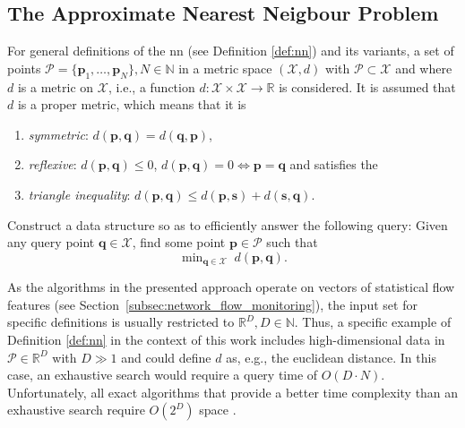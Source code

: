 \documentclass[../../../main.tex]{subfiles}
\begin{document}
\subsection{The Approximate Nearest Neigbour Problem}\label{subsec:approximate_nearest_neighbour_problem}

For general definitions of the \gls{nn} (see Definition \ref{def:nn}) and its variants, a set of points $\mathcal{P} = \{\bm{p}_1, \dots, \bm{p}_N \}, N \in \mathbb{N}$ in a metric space $(\mathcal{X}, d)$ with $\mathcal{P} \subset \mathcal{X}$ and where $d$ is a metric on $\mathcal{X}$, i.e., a function $d: \mathcal{X} \times \mathcal{X} \rightarrow \mathbb{R}$ is considered. It is assumed that $d$ is a proper metric, which means that it is

\begin{enumerate}
    \item \textit{symmetric}: $d(\bm{p},\bm{q})=d(\bm{q},\bm{p})$,
    \item \textit{reflexive}: $d(\bm{p},\bm{q}) \leq 0$, $d(\bm{p},\bm{q})=0 \iff \bm{p}=\bm{q}$ and satisfies the 
    \item \textit{triangle inequality}: $d(\bm{p},\bm{q}) \leq d(\bm{p},\bm{s}) + d(\bm{s},\bm{q})$.
\end{enumerate}

\begin{definition}\label{def:nn}
     Construct a data structure so as to efficiently answer the following query: Given any query point $\bm{q} \in \mathcal{X}$, find some point $\bm{p} \in \mathcal{P}$ such that
    \begin{equation}
        \mathop{\text{min}}_{\bm{q} \in \mathcal{X}} \; d(\bm{p}, \bm{q}).
    \end{equation}
\end{definition}

As the algorithms in the presented approach operate on vectors of statistical flow features (see Section~\ref{subsec:network_flow_monitoring}), the input set for specific definitions is usually restricted to $\mathbb{R}^D, D \in \mathbb{N}$. Thus, a specific example of Definition \ref{def:nn} in the context of this work includes high-dimensional data in $\mathcal{P} \in \mathbb{R}^D$ with $D \gg 1$ and could define $d$ as, e.g., the euclidean distance. In this case, an exhaustive search would require a query time of $O(D \cdot N)$. Unfortunately, all exact algorithms that provide a better time complexity than an exhaustive search require $O(2^D)$ space \cite{rubinstein2018hardness}. %
\end{document}
